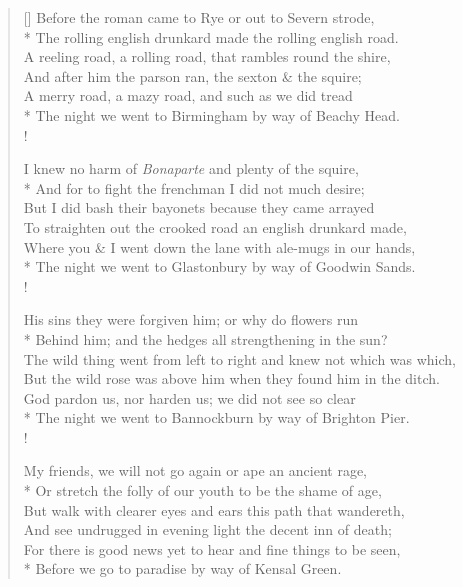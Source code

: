 \documentclass[MAIN]{subfiles}
\begin{document}
\settowidth{\versewidth}{A reeling road, a rolling road, that rambles round the shire,}
\begin{verse}[\versewidth]
Before the roman came to {\sc Rye} or out to {\sc Severn} strode,\\*
The rolling english drunkard made the rolling english road.\\
A reeling road, a rolling road, that rambles round the shire,\\
And after him the parson ran, the sexton \& the squire;\\
A merry road, a mazy road, and such as we did tread\\*
The night we went to {\sc Birmingham} by way of {\sc Beachy Head}.\\!

I knew no harm of \emph{Bonaparte} and plenty of the squire,\\*
And for to fight the frenchman I did not much desire;\\
But I did bash their bayonets because they came arrayed\\
To straighten out the crooked road an english drunkard made,\\
Where you \& I went down the lane with ale-mugs in our hands,\\*
The night we went to {\sc Glastonbury} by way of {\sc Goodwin Sands}.\\! 

His sins they were forgiven him; or why do flowers run\\*
Behind him; and the hedges all strengthening in the sun?\\
The wild thing went from left to right and knew not which was which,\\
But the wild rose was above him when they found him in the ditch.\\
God pardon us, nor harden us; we did not see so clear\\*
The night we went to {\sc Bannockburn} by way of {\sc Brighton Pier}.\\! 

My friends, we will not go again or ape an ancient rage,\\*
Or stretch the folly of our youth to be the shame of age,\\
But walk with clearer eyes and ears this path that wandereth,\\
And see undrugged in evening light the decent inn of death;\\
For there is good news yet to hear and fine things to be seen,\\*
Before we go to paradise by way of {\sc Kensal Green}.
\end{verse}
\end{document}

